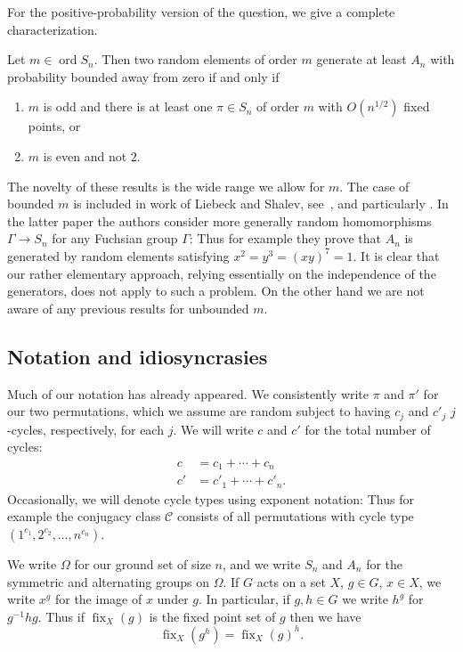 \documentclass[ALCO,ThmDefs,Unicode,epreuves]{cedram}
\DeclareMathOperator{\ord}{ord}
\DeclareMathOperator{\fix}{fix}
\newcommand\calC{\mathcal{C}}
\begin{document}
For the positive-probability version of the question, we give a complete characterization.

\begin{theorem} \label{thm:fixed-order-positive-prob}
Let $m \in \ord S_n$. Then two random elements of order $m$ generate at least $A_n$ with probability bounded away from zero if and only if
\begin{enumerate}
 \item\label{theo1.4_1} $m$ is odd and there is at least one $\pi \in S_n$ of order $m$ with $O(n^{1/2})$ fixed points, or
 \item\label{theo1.4_2} $m$ is even and not $2$.
\end{enumerate}
\end{theorem}

The novelty of these results is the wide range we allow for $m$. The case of bounded $m$ is included in work of Liebeck and Shalev, see~\cite{liebeck-shalev-23generation}, and particularly \cite{liebeck-shalev-fuchsian-groups}. In the latter paper the authors consider more generally random homomorphisms $\Gamma \to S_n$ for any Fuchsian group $\Gamma$: Thus for example they prove that $A_n$ is generated by random elements satisfying $x^2 = y^3 = (xy)^7 = 1$. It is clear that our rather elementary approach, relying essentially on the independence of the generators, does not apply to such a problem. On the other hand we are not aware of any previous results for unbounded $m$.

\subsection{Notation and idiosyncrasies}

Much of our notation has already appeared. We consistently write $\pi$ and $\pi'$ for our two permutations, which we assume are random subject to having $c_j$ and $c'_j$ $j$-cycles, respectively, for each $j$. We will write $c$ and $c'$ for the total number of cycles:
\begin{align*}
 c&= c_1 + \cdots + c_n \\
 c'&= c'_1 + \cdots + c'_n.
\end{align*}
Occasionally, we will denote cycle types using exponent notation: Thus for example the conjugacy class $\calC$ consists of all permutations with cycle type $(1^{c_1}, 2^{c_2}, \dots, n^{c_n})$.

We write $\Omega$ for our ground set of size $n$, and we write $S_n$ and $A_n$ for the symmetric and alternating groups on $\Omega$. If $G$ acts on a set $X$, $g\in G$, $x \in X$, we write $x^g$ for the image of $x$ under $g$. In particular, if $g, h \in G$ we write $h^g$ for $g^{-1}hg$. Thus if $\fix_X(g)$ is the fixed point set of $g$ then we have
\[
 \fix_X(g^h) = \fix_X(g)^h.
\]
\end{document}
